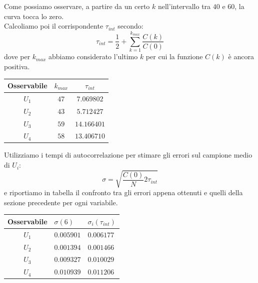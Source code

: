 \documentclass[a4paper,10pt]{article}
\begin{document}
\medskip
\noindent Come possiamo osservare, a partire da un certo $k$ nell'intervallo tra $40$ e $60$, la curva tocca lo zero.\\  
Calcoliamo poi il corrispondente $\tau_{int}$ secondo:
\begin{equation}
\tau_{int}= \frac{1}{2} + \sum_{k=1}^{k_{max}} \frac{C(k)}{C(0)}
\end{equation}
dove per $k_{max}$ abbiamo considerato l'ultimo $k$ per cui la funzione $C(k)$ è ancora positiva.
\medskip
\begin{table}[H]
	\centering
	\begin{tabular}{ccc} 
	\hline
	Osservabile   & $k_{max}$  &  $\tau _{int}$  \\
	\hline
	$U_1$   	  &  $47$ &  $7.069802$  \\
	$U_2$         &  $43$ &  $5.712427$  \\
	$U_3$         &  $59$ &  $14.166401$  \\
	$U_4$         &  $58$ &  $13.406710$  \\
	\hline
	\end{tabular}
\end{table}
\medskip
Utilizziamo i tempi di autocorrelazione per stimare gli errori sul campione medio di $U_i$:
\begin{equation}
\sigma= \sqrt{\frac{C(0)}{N}2\tau_{int}}
\end{equation}
\medskip
e riportiamo in tabella il confronto tra gli errori appena ottenuti e quelli della sezione precedente per ogni variabile.
\medskip 
\begin{table}[H]
	\centering
	\begin{tabular}{cll} 
	\hline
	Osservabile & $\sigma(6)$      & $\sigma_{i}(\tau_{int})$  \\
	\hline
	$U_1$  &   $0.005901$   & $0.006177$  \\
	$U_2$  &   $0.001394$	& $0.001466$  \\
	$U_3$  &   $0.009327$	& $0.010029$   \\
	$U_4$  &   $0.010939$	& $0.011206$   \\
	\hline
	\end{tabular}
\end{table}
\medskip
\end{document}
